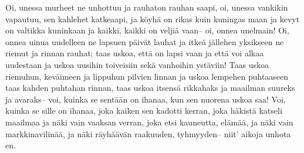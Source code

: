 \endverse
\beginverse
Oi, unessa murheet ne unhottuu
ja rauhaton rauhan saapi,
oi, unessa vankikin vapautuu,
sen kahlehet katkeaapi,
ja köyhä on rikas kuin kuningas maan
ja kevyt on valtikka kuninkaan
ja kaikki, kaikki on veljiä vaan--
oi, onnea unelmain!
\endverse
\beginverse
Oi, onnea uinua uudelleen
ne lapsuen päivät lauhat
ja itkeä jällehen yksikseen
ne riemut ja rinnan rauhat;
taas uskoa, että on lapsi vaan
ja että voi alkaa uudestaan
ja uskoa uusihin toiveisiin
sekä vanhoihin ystäviin!
\endverse
\beginverse
Taas uskoa riemuhun, keväimeen
ja lippuhun pilvien linnan
ja uskoa lempehen puhtaaseen
taas kahden puhtahan rinnan,
taas uskoa itsensä rikkahaks
ja maailman suureks ja avaraks--
voi, kuinka se sentään on ihanaa,
kun sen nuorena uskoa saa!
\endverse
\beginverse
Voi, kuinka se sille on ihanaa,
joka kaiken sen kadotti kerran,
joka häkistä katseli maailmaa
ja näki vain vaaksan verran,
joka etsi kauneutta, elämää,
ja näki vain markkinavilinää,
ja näki räyhäävän raakuuden, tyhmyyden--
niit' aikoja unhota en.
\endverse
\beginverse

